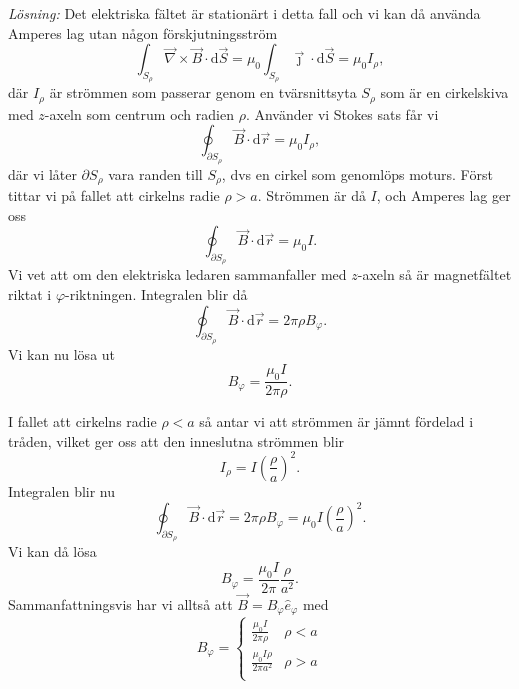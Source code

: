 \documentclass[%
oneside,                 %
final,                   %
10pt]{article}
\begin{document}
\vspace{3mm}


\emph{Lösning:}  Det elektriska fältet är stationärt i detta fall och vi kan då använda Amperes lag utan någon förskjutningsström
\begin{equation}
  \int_{S_\rho} \vec{\nabla} \times \vec{B} \cdot \mbox{d}\vec{S} = \mu_0 \int_{S_\rho} \vec{\jmath} \cdot \mbox{d}\vec{S} = \mu_0 I_\rho,
\end{equation}
där $I_\rho$ är strömmen som passerar genom en tvärsnittsyta $S_\rho$ som är en cirkelskiva med $z$-axeln som centrum och radien $\rho$. Använder vi Stokes sats får vi
\begin{equation}
  \oint_{\partial S_\rho} \vec{B} \cdot \mbox{d}\vec{r} = \mu_0 I_\rho,
\end{equation}
där vi låter $\partial S_\rho$ vara randen till $S_\rho$, dvs en cirkel som genomlöps moturs. Först 
tittar vi på fallet att cirkelns radie $\rho > a$.  Strömmen 
är då $I$, och Amperes lag ger oss
\begin{equation}
  \oint_{\partial S_\rho} \vec{B} \cdot \mbox{d}\vec{r} = \mu_0 I.
\end{equation}
Vi vet att om den elektriska ledaren sammanfaller med  $z$-axeln så är magnetfältet riktat i $\varphi$-riktningen.
Integralen blir då
\begin{equation}
  \oint_{\partial S_\rho} \vec{B} \cdot \mbox{d}\vec{r} = 2\pi \rho B_\varphi.
\end{equation}
Vi kan nu lösa ut
\begin{equation}
  B_\varphi = \frac{\mu_0 I}{2\pi \rho}.
\end{equation}

I fallet att cirkelns radie $\rho < a$ så antar vi att strömmen är 
jämnt fördelad i tråden, vilket ger oss att den inneslutna strömmen
blir
\begin{equation}
  I_\rho = I \left(\frac{\rho}{a}\right)^2.
\end{equation}
Integralen blir nu
\begin{equation}
  \oint_{\partial S_\rho} \vec{B} \cdot \mbox{d}\vec{r} = 2\pi \rho B_\varphi = \mu_0 I 
\left(\frac{\rho}{a}\right)^2.
\end{equation}
Vi kan då lösa 
\begin{equation}
  B_\varphi = \frac{\mu_0 I}{2\pi} \frac{\rho}{a^2}.
\end{equation}
Sammanfattningsvis har vi alltså att $\vec{B} = B_\varphi \hat{e}_\varphi$ med
\begin{equation}
  B_\varphi = \left\{\begin{array}{lr}
\frac{\mu_0 I}{2\pi \rho} & \rho < a\\
\frac{\mu_0 I\rho}{2\pi a^2} & \rho > a\\
\end{array}\right.
\end{equation}
\end{document}
